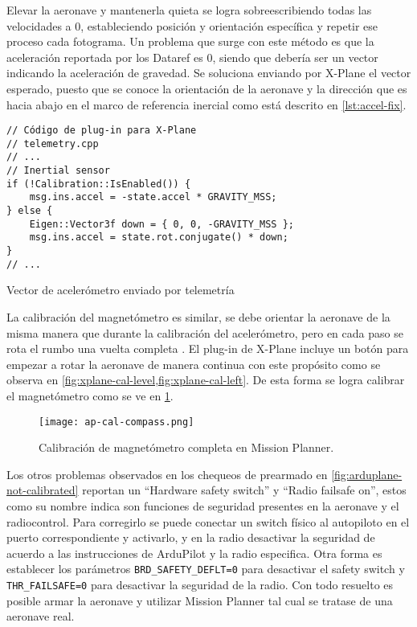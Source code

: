 Elevar la aeronave y mantenerla quieta se logra sobreescribiendo todas las velocidades a 0, estableciendo posición y orientación específica y repetir ese proceso cada fotograma. Un problema que surge con este método es que la aceleración reportada por los Dataref es 0, siendo que debería ser un vector indicando la aceleración de gravedad. Se soluciona enviando por X-Plane el vector esperado, puesto que se conoce la orientación de la aeronave y la dirección que es hacia abajo en el marco de referencia inercial como está descrito en \cref{lst:accel-fix}.

\begin{listing}[h]
    \begin{verbatim}
// Código de plug-in para X-Plane
// telemetry.cpp
// ...
// Inertial sensor
if (!Calibration::IsEnabled()) {
    msg.ins.accel = -state.accel * GRAVITY_MSS;
} else {
    Eigen::Vector3f down = { 0, 0, -GRAVITY_MSS };
    msg.ins.accel = state.rot.conjugate() * down;
}
// ...
    \end{verbatim}
    \caption{Vector de acelerómetro enviado por telemetría}
    \label{lst:accel-fix}
\end{listing}

La calibración del magnetómetro es similar, se debe orientar la aeronave de la misma manera que durante la calibración del acelerómetro, pero en cada paso se rota el rumbo una vuelta completa \cite{arduplane-compass}. El plug-in de X-Plane incluye un botón para empezar a rotar la aeronave de manera continua con este propósito como se observa en \cref{fig:xplane-cal-level,fig:xplane-cal-left}. De esta forma se logra calibrar el magnetómetro como se ve en \cref{fig:ap-cal-compass}.

\begin{figure}[h]
    \centering
    \texttt{[image: ap-cal-compass.png]}
    \caption{Calibración de magnetómetro completa en Mission Planner.}
    \label{fig:ap-cal-compass}
\end{figure}

Los otros problemas observados en los chequeos de prearmado en \cref{fig:arduplane-not-calibrated} reportan un ``Hardware safety switch'' y ``Radio failsafe on'', estos como su nombre indica son funciones de seguridad presentes en la aeronave y el radiocontrol. Para corregirlo se puede conectar un switch físico al autopiloto en el puerto correspondiente y activarlo, y en la radio desactivar la seguridad de acuerdo a las instrucciones de ArduPilot y la radio especifica. Otra forma es establecer los parámetros \texttt{BRD\_SAFETY\_DEFLT=0} para desactivar el safety switch y \texttt{THR\_FAILSAFE=0} para desactivar la seguridad de la radio. Con todo resuelto es posible armar la aeronave y utilizar Mission Planner tal cual se tratase de una aeronave real.

